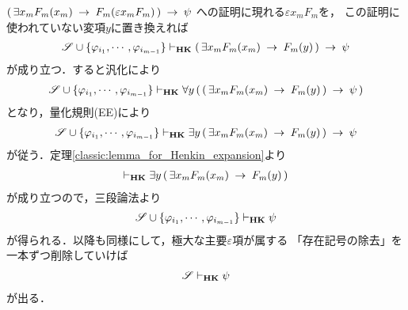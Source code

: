 \begin{sketch}
		$(\, \exists x_{m} F_{m}(x_{m}) \hspace{0.25em}\rightarrow\hspace{0.25em} F_{m}(\varepsilon x_{m} F_{m})\, ) \hspace{0.25em}\rightarrow\hspace{0.25em} \psi$
		への証明に現れる$\varepsilon x_{m} F_{m}$を，
		この証明に使われていない変項$y$に置き換えれば
		\begin{align}
			\mathscr{S} \cup \{\varphi_{i_{1}},\cdots,\varphi_{i_{m-1}}\} 
			\vdash_{{\scriptsize \mbox{{\bf HK}}}} 
			(\, \exists x_{m} F_{m}(x_{m}) \hspace{0.25em}\rightarrow\hspace{0.25em} F_{m}(y)\, ) \hspace{0.25em}\rightarrow\hspace{0.25em} \psi
		\end{align}
		が成り立つ．すると汎化により
		\begin{align}
			\mathscr{S} \cup \{\varphi_{i_{1}},\cdots,\varphi_{i_{m-1}}\} 
			\vdash_{{\scriptsize \mbox{{\bf HK}}}} 
			\forall y\, (\, (\, \exists x_{m} F_{m}(x_{m}) \hspace{0.25em}\rightarrow\hspace{0.25em} F_{m}(y)\, ) \hspace{0.25em}\rightarrow\hspace{0.25em} \psi\, )
		\end{align}
		となり，量化規則(EE)により
		\begin{align}
			\mathscr{S} \cup \{\varphi_{i_{1}},\cdots,\varphi_{i_{m-1}}\} 
			\vdash_{{\scriptsize \mbox{{\bf HK}}}} 
			\exists y\, (\, \exists x_{m} F_{m}(x_{m}) \hspace{0.25em}\rightarrow\hspace{0.25em} F_{m}(y)\, ) \hspace{0.25em}\rightarrow\hspace{0.25em} \psi
		\end{align}
		が従う．定理\ref{classic:lemma_for_Henkin_expansion}より
		\begin{align}
			\vdash_{{\scriptsize \mbox{{\bf HK}}}} 
			\exists y\, (\, \exists x_{m} F_{m}(x_{m}) \hspace{0.25em}\rightarrow\hspace{0.25em} F_{m}(y)\, )
		\end{align}
		が成り立つので，三段論法より
		\begin{align}
			\mathscr{S} \cup \{\varphi_{i_{1}},\cdots,\varphi_{i_{m-1}}\} 
			\vdash_{{\scriptsize \mbox{{\bf HK}}}} \psi
		\end{align}
		が得られる．以降も同様にして，極大な主要$\varepsilon$項が属する
		「存在記号の除去」を一本ずつ削除していけば
		\begin{align}
			\mathscr{S} \vdash_{{\scriptsize \mbox{{\bf HK}}}} \psi
		\end{align}
		が出る．
		\QED
	\end{sketch}
	
